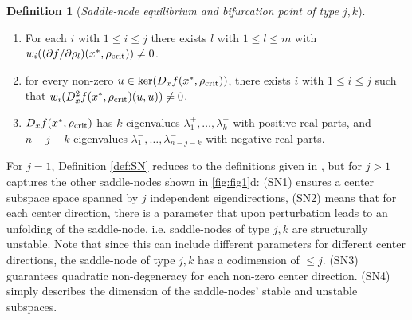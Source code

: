 \documentclass{article}
\theoremstyle{definition}
\newtheorem{definition}{Definition}[section]
\begin{document}
\begin{refsection}
\begin{definition}[\textit{Saddle-node equilibrium and bifurcation point of type $j,k$}]
\begin{enumerate}[label={(\textbf{SN\arabic*})}, ref={(\textbf{G\arabic*})}]
    \item For each $i$ with $1\leq i \leq j$ there exists $l$ with $1\leq l \leq m$ with $w_i((\partial f/\partial\rho_l)(x^*,\rho_{\textnormal{crit}})) \neq 0$.
    \item for every non-zero $u\in \ker(D_xf(x^*,\rho_{\textnormal{crit}}))$, there exists $i$ with $1\leq i \leq j$ such that \mbox{$w_i(D_x^2f(x^*,\rho_{\textnormal{crit}})(u,u))\neq 0$}.
    \item $D_xf(x^*,\rho_{\textnormal{crit}})$ has $k$ eigenvalues $\lambda^+_1,\dots,\lambda^+_k$ with positive real parts, and $n-j-k$ eigenvalues $\lambda^-_1,\dots,\lambda^-_{n-j-k}$ with negative real parts.
\end{enumerate}
\end{definition}

For $j=1$, Definition \ref{def:SN} reduces to the definitions given in \cite{Amaral2010,Amaral2012}, but for $j>1$ captures the other saddle-nodes shown in \autoref{fig:fig1}d: (SN1) ensures a center subspace space spanned by $j$ independent eigendirections, (SN2) means that for each center direction, there is a parameter that upon perturbation leads to an unfolding of the saddle-node, i.e. saddle-nodes of type $j,k$ are structurally unstable. Note that since this can include different parameters for different center directions, the saddle-node of type $j,k$ has a codimension of $\leq j$. (SN3) guarantees quadratic non-degeneracy for each non-zero center direction. 
(SN4) simply describes the dimension of the saddle-nodes' stable and unstable subspaces.


\end{refsection}
\end{document}
